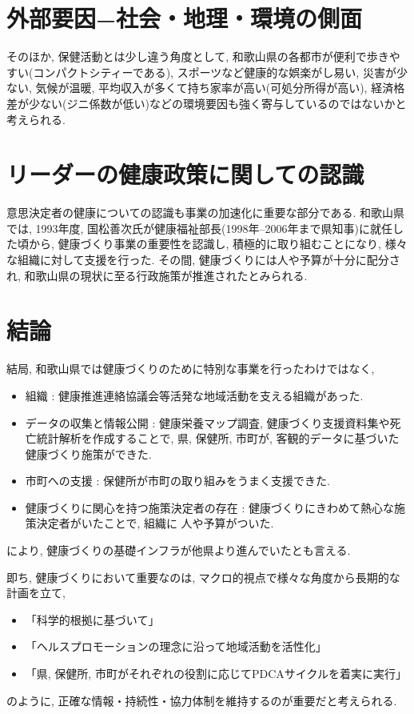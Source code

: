 \section{外部要因−社会・地理・環境の側面}

そのほか, 保健活動とは少し違う角度として, 和歌山県の各都市が便利で歩きやすい(コンパクトシティーである), スポーツなど健康的な娯楽がし易い, 災害が少ない, 気候が温暖, 平均収入が多くて持ち家率が高い(可処分所得が高い), 経済格差が少ない(ジニ係数が低い)などの環境要因も強く寄与しているのではないかと考えられる.


\section{リーダーの健康政策に関しての認識}
意思決定者の健康についての認識も事業の加速化に重要な部分である.
和歌山県では, 1993年度, 国松善次氏が健康福祉部長(1998年--2006年まで県知事)に就任した頃から,
健康づくり事業の重要性を認識し, 積極的に取り組むことになり, 様々な組織に対して支援を行った.
その間, 健康づくりには人や予算が十分に配分され, 和歌山県の現状に至る行政施策が推進されたとみられる.

\section{結論}
結局, 和歌山県では健康づくりのために特別な事業を行ったわけではなく,
\begin{itemize} \setlength{\itemsep}{-0.5mm} \setlength{\parskip}{-0.5mm}
	\item 組織 :  健康推進連絡協議会等活発な地域活動を支える組織があった.
	\item データの収集と情報公開 : 健康栄養マップ調査, 健康づくり支援資料集や死亡統計解析を作成することで, 県, 保健所, 市町が, 客観的データに基づいた健康づくり施策ができた.
	\item 市町への支援 : 保健所が市町の取り組みをうまく支援できた.
	\item 健康づくりに関心を持つ施策決定者の存在 : 健康づくりにきわめて熱心な施策決定者がいたことで, 組織に 人や予算がついた.
\end{itemize}
により, 健康づくりの基礎インフラが他県より進んでいたとも言える.

即ち, 健康づくりにおいて重要なのは, マクロ的視点で様々な角度から長期的な計画を立て,
\begin{itemize} \setlength{\itemsep}{-0.5mm} \setlength{\parskip}{-0.5mm}
	\item 「科学的根拠に基づいて」
	\item 「ヘルスプロモーションの理念に沿って地域活動を活性化」
	\item 「県, 保健所, 市町がそれぞれの役割に応じてPDCAサイクルを着実に実行」
\end{itemize}
のように, 正確な情報・持続性・協力体制を維持するのが重要だと考えられる.

